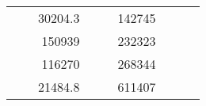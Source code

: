 \begin{table}[H]
\begin{tabular}{|ccrccrccc}
\multicolumn{1}{|c|}{\cellcolor[HTML]{FFFFC7}}                                & \multicolumn{1}{c|}{\cellcolor[HTML]{DDFDFF}}                      & \multicolumn{1}{r|}{\cellcolor[HTML]{DAE8FC}30204.3}   & \multicolumn{1}{c|}{\cellcolor[HTML]{FFFFC7}}                                & \multicolumn{1}{c|}{\cellcolor[HTML]{DDFDFF}}                       & \multicolumn{1}{r|}{\cellcolor[HTML]{DDFDFF}142745}    &                                                                              &                                                                    &                                                        \\ \cline{3-3} \cline{6-6}
\multicolumn{1}{|c|}{\cellcolor[HTML]{FFFFC7}}                                & \multicolumn{1}{c|}{\cellcolor[HTML]{DDFDFF}}                      & \multicolumn{1}{r|}{\cellcolor[HTML]{DDFDFF}150939}    & \multicolumn{1}{c|}{\cellcolor[HTML]{FFFFC7}}                                & \multicolumn{1}{c|}{\cellcolor[HTML]{DDFDFF}}                       & \multicolumn{1}{r|}{\cellcolor[HTML]{DAE8FC}232323}    &                                                                              &                                                                    &                                                        \\ \cline{3-3} \cline{6-6}
\multicolumn{1}{|c|}{\cellcolor[HTML]{FFFFC7}}                                & \multicolumn{1}{c|}{\cellcolor[HTML]{DDFDFF}}                      & \multicolumn{1}{r|}{\cellcolor[HTML]{DAE8FC}116270}    & \multicolumn{1}{c|}{\cellcolor[HTML]{FFFFC7}}                                & \multicolumn{1}{c|}{\cellcolor[HTML]{DDFDFF}}                       & \multicolumn{1}{r|}{\cellcolor[HTML]{DDFDFF}268344}    &                                                                              &                                                                    &                                                        \\ \cline{3-3} \cline{6-6}
\multicolumn{1}{|c|}{\cellcolor[HTML]{FFFFC7}}                                & \multicolumn{1}{c|}{\cellcolor[HTML]{DDFDFF}}                      & \multicolumn{1}{r|}{\cellcolor[HTML]{DDFDFF}21484.8}   & \multicolumn{1}{c|}{\cellcolor[HTML]{FFFFC7}}                                & \multicolumn{1}{c|}{\cellcolor[HTML]{DDFDFF}}                       & \multicolumn{1}{r|}{\cellcolor[HTML]{DAE8FC}611407}    &                                                                              &                                                                    &                                                        \\ \cline{3-3} \cline{6-6}

\end{tabular}
\end{table}
